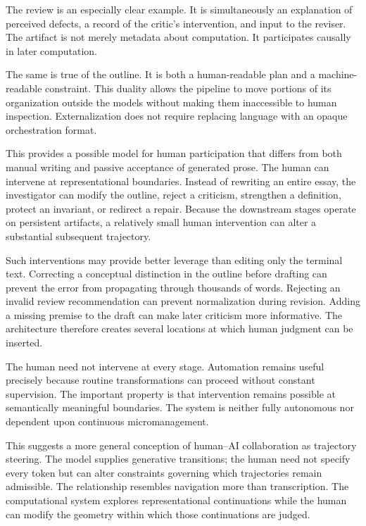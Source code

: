 \documentclass[11pt]{article}
\begin{document}
The review is an especially clear example. It is simultaneously an explanation of perceived defects, a record of the critic's intervention, and input to the reviser. The artifact is not merely metadata about computation. It participates causally in later computation.

The same is true of the outline. It is both a human-readable plan and a machine-readable constraint. This duality allows the pipeline to move portions of its organization outside the models without making them inaccessible to human inspection. Externalization does not require replacing language with an opaque orchestration format.

This provides a possible model for human participation that differs from both manual writing and passive acceptance of generated prose. The human can intervene at representational boundaries. Instead of rewriting an entire essay, the investigator can modify the outline, reject a criticism, strengthen a definition, protect an invariant, or redirect a repair. Because the downstream stages operate on persistent artifacts, a relatively small human intervention can alter a substantial subsequent trajectory.

Such interventions may provide better leverage than editing only the terminal text. Correcting a conceptual distinction in the outline before drafting can prevent the error from propagating through thousands of words. Rejecting an invalid review recommendation can prevent normalization during revision. Adding a missing premise to the draft can make later criticism more informative. The architecture therefore creates several locations at which human judgment can be inserted.

The human need not intervene at every stage. Automation remains useful precisely because routine transformations can proceed without constant supervision. The important property is that intervention remains possible at semantically meaningful boundaries. The system is neither fully autonomous nor dependent upon continuous micromanagement.

This suggests a more general conception of human--AI collaboration as trajectory steering. The model supplies generative transitions; the human need not specify every token but can alter constraints governing which trajectories remain admissible. The relationship resembles navigation more than transcription. The computational system explores representational continuations while the human can modify the geometry within which those continuations are judged.
\end{document}
